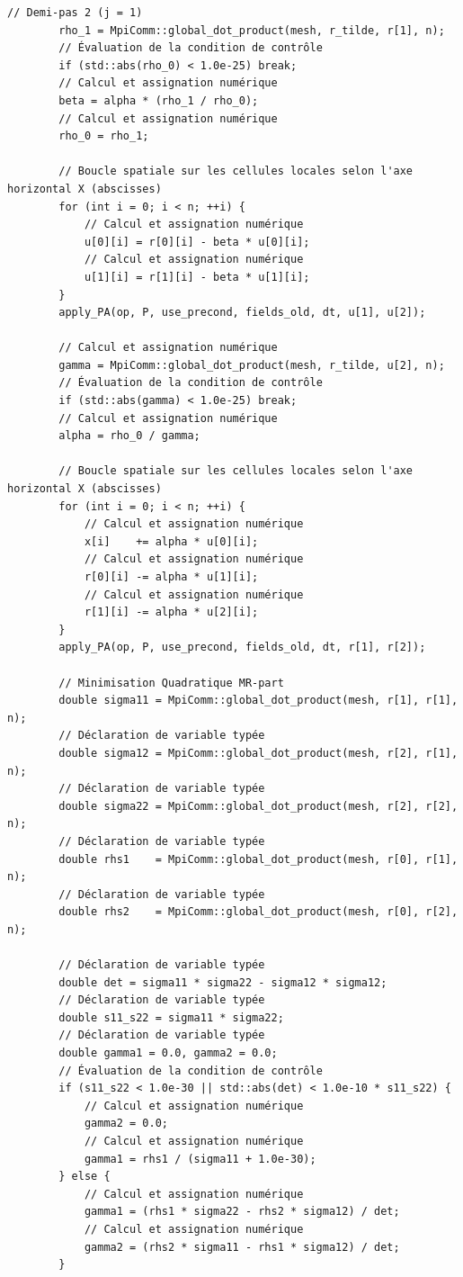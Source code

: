 \documentclass[10pt,a4paper,oneside]{book}
\begin{document}
\begin{lstlisting}[language={[11]C++}]
        // Demi-pas 2 (j = 1)
        rho_1 = MpiComm::global_dot_product(mesh, r_tilde, r[1], n);
        // Évaluation de la condition de contrôle
        if (std::abs(rho_0) < 1.0e-25) break;
        // Calcul et assignation numérique
        beta = alpha * (rho_1 / rho_0);
        // Calcul et assignation numérique
        rho_0 = rho_1;

        // Boucle spatiale sur les cellules locales selon l'axe horizontal X (abscisses)
        for (int i = 0; i < n; ++i) {
            // Calcul et assignation numérique
            u[0][i] = r[0][i] - beta * u[0][i];
            // Calcul et assignation numérique
            u[1][i] = r[1][i] - beta * u[1][i];
        }
        apply_PA(op, P, use_precond, fields_old, dt, u[1], u[2]);

        // Calcul et assignation numérique
        gamma = MpiComm::global_dot_product(mesh, r_tilde, u[2], n);
        // Évaluation de la condition de contrôle
        if (std::abs(gamma) < 1.0e-25) break;
        // Calcul et assignation numérique
        alpha = rho_0 / gamma;

        // Boucle spatiale sur les cellules locales selon l'axe horizontal X (abscisses)
        for (int i = 0; i < n; ++i) {
            // Calcul et assignation numérique
            x[i]    += alpha * u[0][i];
            // Calcul et assignation numérique
            r[0][i] -= alpha * u[1][i];
            // Calcul et assignation numérique
            r[1][i] -= alpha * u[2][i];
        }
        apply_PA(op, P, use_precond, fields_old, dt, r[1], r[2]);

        // Minimisation Quadratique MR-part
        double sigma11 = MpiComm::global_dot_product(mesh, r[1], r[1], n);
        // Déclaration de variable typée
        double sigma12 = MpiComm::global_dot_product(mesh, r[2], r[1], n);
        // Déclaration de variable typée
        double sigma22 = MpiComm::global_dot_product(mesh, r[2], r[2], n);
        // Déclaration de variable typée
        double rhs1    = MpiComm::global_dot_product(mesh, r[0], r[1], n);
        // Déclaration de variable typée
        double rhs2    = MpiComm::global_dot_product(mesh, r[0], r[2], n);

        // Déclaration de variable typée
        double det = sigma11 * sigma22 - sigma12 * sigma12;
        // Déclaration de variable typée
        double s11_s22 = sigma11 * sigma22;
        // Déclaration de variable typée
        double gamma1 = 0.0, gamma2 = 0.0;
        // Évaluation de la condition de contrôle
        if (s11_s22 < 1.0e-30 || std::abs(det) < 1.0e-10 * s11_s22) {
            // Calcul et assignation numérique
            gamma2 = 0.0;
            // Calcul et assignation numérique
            gamma1 = rhs1 / (sigma11 + 1.0e-30);
        } else {
            // Calcul et assignation numérique
            gamma1 = (rhs1 * sigma22 - rhs2 * sigma12) / det;
            // Calcul et assignation numérique
            gamma2 = (rhs2 * sigma11 - rhs1 * sigma12) / det;
        }


\end{lstlisting}
\end{document}
